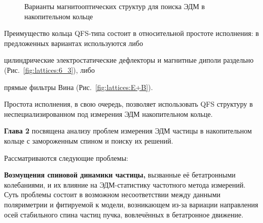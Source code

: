 \begin{figure}[H]
	\begin{minipage}{.5\linewidth}{
	}
	\end{minipage}%
	\begin{minipage}{.5\linewidth}\captionsetup{width=.85\linewidth}
	\caption{Варианты магнитооптических структур для поиска ЭДМ в накопительном кольце}
	\end{minipage}
\end{figure}

Преимущество кольца QFS-типа состоит в относительной простоте исполнения: 
в предложенных вариантах используются либо
\begin{enumerate*}
	\item цилиндрические электростатические дефлекторы и магнитные диполи раздельно
	 (Рис.~\ref{fig:lattices:6_3}), либо
	\item прямые фильтры Вина (Рис.~\ref{fig:lattices:E+B}).	
\end{enumerate*}
Простота исполнения, в свою очередь, позволяет использовать QFS структуру в неспециализированном под
измерения ЭДМ накопительном кольце.

\textbf{Глава 2} посвящена анализу проблем измерения ЭДМ частицы 
в накопительном кольце с замороженным спином и поиску их решений. 

Рассматриваются следующие проблемы:

\textbf{Возмущения спиновой динамики частицы,} вызванные её бетатронными колебаниями, и их влияние на ЭДМ-статистику частотного метода измерений.
%
Суть проблемы состоит в возможном несоответствии между данными поляриметрии и фитируемой к модели, 
возникающем из-за вариации направления осей стабильного спина частиц пучка, 
вовлечённых в бетатронное движение.

